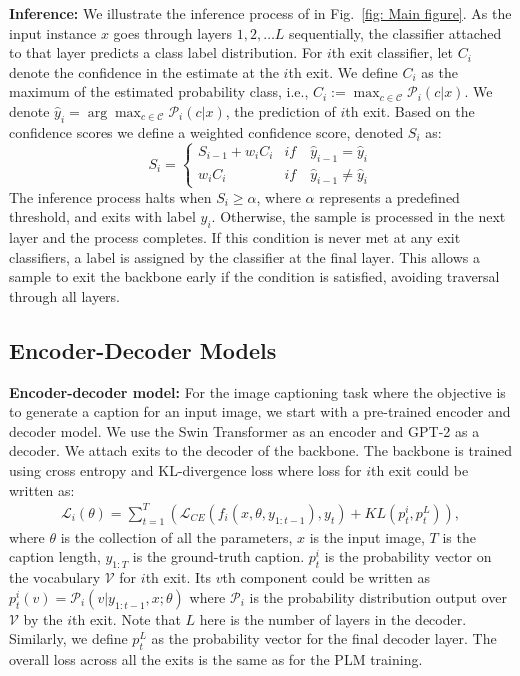 \textbf{Inference:} We illustrate the inference process of \algo{} in Fig.~\ref{fig: Main figure}.  As the input instance $x$ goes through layers $1, 2, \ldots L$ sequentially, the classifier attached to that layer predicts a class label distribution. For $i$th exit classifier, let $C_i$ denote the confidence in the estimate at the $i$th exit. We define $C_i$ as the maximum of the estimated probability class, i.e., $C_i:=\max_{c\in \mathcal{C}}{\mathcal{P}}_i(c|x)$. We denote $\hat{y}_i = \arg \max_{c\in \mathcal{C}}{\mathcal{P}}_i(c|x)$, the prediction of $i$th exit. Based on the confidence scores we define a weighted confidence score, denoted $S_i$ as:
\begin{equation}
\label{eq: Reward}
    S_i = \left\{
        \begin{array}{ll}
            S_{i-1}+w_i C_i & \textit{if} \quad \hat{y}_{i-1} = \hat{y}_i \\
            w_i C_i & \textit{if} \quad \hat{y}_{i-1} \neq \hat{y}_i
        \end{array}
    \right.
\end{equation}
The inference process halts when $S_i \geq \alpha$, where $\alpha$ represents a predefined threshold, and exits with label $\hat{y}_i$. Otherwise, the sample is processed in the next layer and the process completes. If this condition is never met at any exit classifiers, a label is assigned by the classifier at the final layer. This allows a sample to exit the backbone early if the condition is satisfied, avoiding traversal through all layers.



\subsection{Encoder-Decoder Models}
\textbf{Encoder-decoder model:} For the image captioning task where the objective is to generate a caption for an input image, we start with a pre-trained encoder and decoder model. We use the Swin Transformer \citep{liu2021swin} as an encoder and GPT-2 \citep{radford2019language} as a decoder. We attach exits to the decoder of the backbone. The backbone is trained using cross entropy and KL-divergence loss where loss for $i$th exit could be written as:
\begin{eqnarray*}
    \mathcal{L}_i(\theta) = \sum_{t=1}^{T}(\mathcal{L}_{CE}(f_i(x, \theta, y_{1:t-1}), y_t) +KL(p_t^i, p_t^L)),
\end{eqnarray*}
where $\theta$ is the collection of all the parameters, $x$ is the input image, $T$ is the caption length, $y_{1:T}$ is the ground-truth caption. $p_t^i$ is the probability vector on the vocabulary $\mathcal{V}$ for $i$th exit. Its $v$th component could be written as $p_t^i(v) = \mathcal{P}_i(v|y_{1:t-1}, x; \theta)$ where $\mathcal{P}_i$ is the probability distribution output over $\mathcal{V}$ by the $i$th exit. Note that $L$ here is the number of layers in the decoder. Similarly, we define $p_t^L$ as the probability vector for the final decoder layer. The overall loss across all the exits is the same as for the PLM training.

